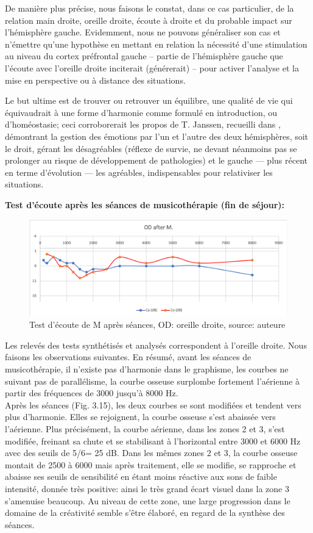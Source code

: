De manière plus précise, nous faisons le constat, dans ce cas
particulier,  de la relation main droite, oreille droite, écoute
à droite et du probable impact sur l'hémisphère gauche.
Evidemment, nous ne pouvons généraliser son cas et 
n'émettre qu'une hypothèse
en mettant en relation la nécessité d'une stimulation au niveau du cortex préfrontal
gauche -- partie de l'hémisphère gauche que l'écoute avec
l'oreille droite inciterait (générerait) -- pour activer l'analyse et la
mise en perspective ou à distance des situations.

Le but ultime est de trouver ou
retrouver un équilibre, une qualité de vie qui équivaudrait à une forme d'harmonie comme formulé en 
introduction, ou d'homéostasie;  ceci
corroborerait les
propos de T. Janssen, recueilli dans  \autocite {van_eersel_cerveau}, démontrant la gestion des 
émotions par
l'un et l'autre des deux hémisphères, soit le droit,  gérant les désagréables
(réflexe de survie, ne devant néanmoins pas se prolonger au risque de
développement de pathologies)
et  le gauche --- plus récent en terme d'évolution ---  les
agréables, indispensables pour relativiser les situations.

\textbf{ Test d'écoute après les séances de musicothérapie (fin de séjour):}



\begin{figure}[h]
	\centering
	
	\includegraphics[width=0.7\linewidth]{images/clinique/od_after_m.png}
	\caption{Test d'écoute de M après séances, OD: oreille droite, source: auteure}
	\label{fig:odaftermeyer}
\end{figure}
Les relevés des tests synthétisés et analysés correspondent à l'oreille droite.
Nous faisons les observations suivantes.
En résumé, avant les séances de musicothérapie, il n'existe pas d'harmonie dans le graphisme, les 
courbes ne suivant pas de 
parallélisme, la courbe osseuse  surplombe fortement l'aérienne 
à partir des fréquences de 3000 jusqu'à 8000 Hz.
\\
Après les séances (Fig. 3.15), les deux courbes se sont modifiées et tendent vers plus d'harmonie.
Elles se rejoignent, la courbe osseuse s'est abaissée vers l'aérienne.
 Plus précisément, la courbe aérienne, dans les
zones 2 et 3,  s'est modifiée, freinant sa
chute et se stabilisant à l'horizontal entre 3000 et 6000 Hz
avec des seuils de 5/6= 25 dB.
Dans les mêmes zones 2 et 3, la
courbe osseuse montait de 2500 à 6000 mais après traitement,
elle se modifie, se rapproche et abaisse ses seuils de
sensibilité en étant moins réactive aux sons de faible
intensité, donnée très positive: ainsi le très grand écart visuel dans la zone 3 s'amenuise beaucoup. Au 
niveau de cette
zone, une large progression dans
le domaine de la créativité semble s'être élaboré, en regard de la synthèse des séances. 

